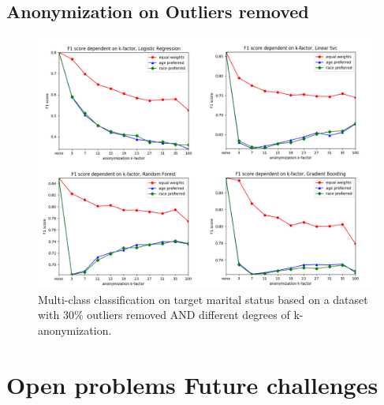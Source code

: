 \documentclass{llncs}
\begin{document}
\subsection{Anonymization on Outliers removed}
\label{ssect:anon_outliers_removed}

\begin{figure}[!h]
	\centering
	\includegraphics[width=1\textwidth]{figures/anon_outliers/anon_outliers_marital_combined}
	\caption{Multi-class classification on target marital status based on a dataset with 30\% outliers removed AND different degrees of k-anonymization.}
	\label{fig:results_anonymization_outliers_marital_status}
\end{figure}





\section{Open problems Future challenges}
\label{sect:op_fc}

	
	
\end{document}
